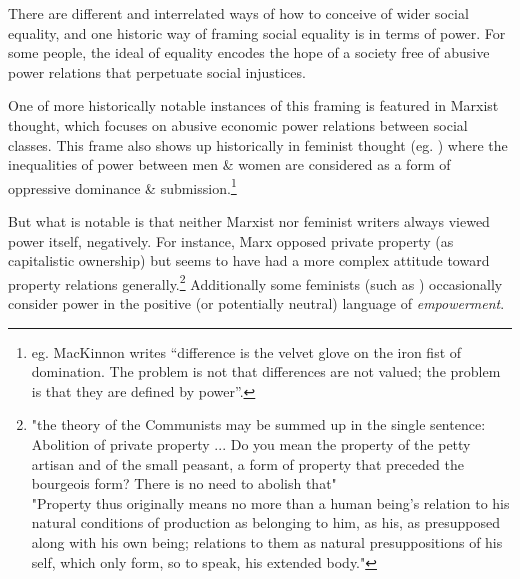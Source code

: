 There are different and interrelated ways of how to conceive of wider social equality, and one historic way of framing social equality is in terms of power.
For some people, the ideal of equality encodes the hope of a society free of abusive power relations that perpetuate social injustices.

One of \DIFaddbegin {}\DIFaddend more historically notable instances of this framing is featured in Marxist thought, which focuses on abusive economic power relations between social classes. This frame also shows up historically in feminist thought (eg. \cite{Cudd2006-CUDAO}) where the inequalities of power between men \& women are considered as a form of oppressive dominance \& submission.\footnote{eg. MacKinnon writes ``difference is the velvet glove on the iron fist of domination. The problem is not that differences are not valued; the problem is that they are defined by power''\cite{mackinnon1989toward}.}

But what is notable is that neither Marxist nor feminist writers always viewed power itself, negatively.
For instance, Marx opposed private property (as capitalistic ownership) but seems to have had a more complex attitude toward property relations generally.\footnote{"the theory of the Communists may be summed up in the single sentence: Abolition of private property ... Do you mean the property of the petty artisan and of the small peasant, a form of property that preceded the bourgeois form? There is no need to abolish that"\cite{MarxGutenberg}\\"Property thus originally means no more than a human being's relation to his natural conditions of production as belonging to him, as his, as presupposed along with his own being; relations to them as natural presuppositions of his self, which only form, so to speak, his extended body."\cite[Notebook V]{marx1993grundrisse}}
Additionally some feminists (such as \cite{doi:10.1111/j.1527-2001.1998.tb01350.x}) occasionally consider power in the positive (or potentially neutral) language of \textit{empowerment}.

